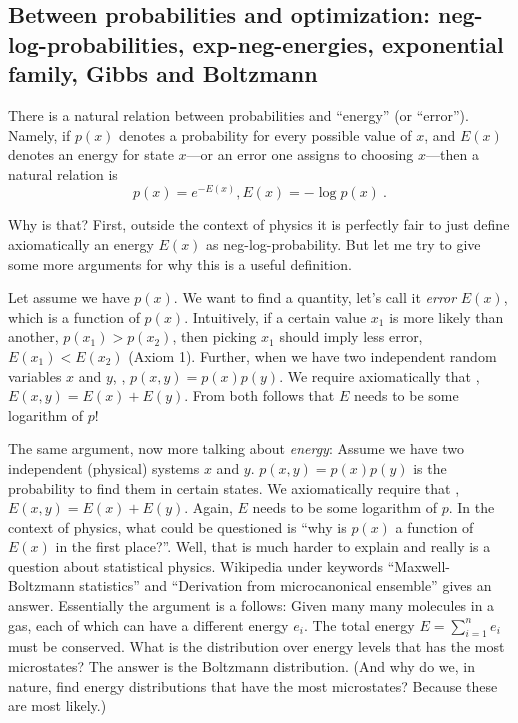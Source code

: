 \subsection{Between probabilities and optimization: neg-log-probabilities,
exp-neg-energies, exponential family, Gibbs and Boltzmann}

There is a natural relation between probabilities and ``energy''
(or ``error''). Namely, if $p(x)$ denotes a probability for every
possible value of $x$, and
$E(x)$ denotes an energy for state $x$---or an error one assigns to
choosing $x$---then a natural relation is
\begin{equation}
p(x) = e^{-E(x)} \comma E(x) = -\log p(x) ~.
\end{equation}

Why is that? First, outside the context of physics it is perfectly
fair to just define axiomatically an energy $E(x)$ as
neg-log-probability. But let me try to give some more arguments for
why this is a useful definition.

Let assume we have $p(x)$. We want to find a quantity, let's call
it \emph{error} $E(x)$, which is a function of $p(x)$. Intuitively, if
a certain value $x_1$ is more likely than another, $p(x_1) > p(x_2)$,
then picking $x_1$ should imply less error, $E(x_1) <
E(x_2)$ (Axiom 1). Further, when we have two independent random variables $x$
and $y$, , $p(x,y) = p(x)
p(y)$. We require axiomatically that ,
$E(x,y) = E(x) + E(y)$. From both follows that $E$ needs to be some
logarithm of $p$!

The same argument, now more talking about \emph{energy}: Assume we
have two independent (physical) systems $x$ and $y$. $p(x,y) = p(x)
p(y)$ is the probability to find them in certain states. We
axiomatically require that , $E(x,y) = E(x)
+ E(y)$. Again, $E$ needs to be some logarithm of $p$. In the context
of physics, what could be questioned is ``why is $p(x)$ a function of
$E(x)$ in the first place?''. Well, that is much harder to
explain and really is a question about statistical physics. Wikipedia
under keywords ``Maxwell-Boltzmann statistics'' and ``Derivation from
microcanonical ensemble'' gives an answer. Essentially the argument is
a follows: Given many many molecules in a gas, each of which can have
a different energy $e_i$. The  total energy $E = \sum_{i=1}^n e_i$
must be conserved. What is the distribution over energy levels that
has the most microstates? The answer is the Boltzmann
distribution. (And why do we, in nature, find energy distributions
that have the most microstates? Because these are most likely.)

